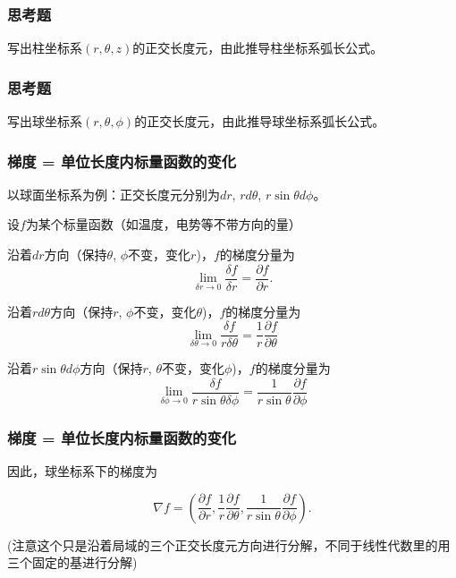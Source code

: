 \documentclass[CJK]{beamer}
\begin{document}
\begin{frame}
\frametitle{思考题}



写出柱坐标系$(r,\theta, z)$的正交长度元，由此推导柱坐标系弧长公式。


\end{frame}


\begin{frame}
\frametitle{思考题}



写出球坐标系$(r,\theta, \phi)$的正交长度元，由此推导球坐标系弧长公式。


\end{frame}


\begin{frame}
  \frametitle{梯度 = 单位长度内标量函数的变化}
  
  以球面坐标系为例：正交长度元分别为$dr$, $rd\theta$, $r\sin\theta d\phi$。

  \skipline

  设$f$为某个标量函数（如温度，电势等不带方向的量）

  \bitem

\item{沿着$dr$方向（保持$\theta$, $\phi$不变，变化$r$)，$f$的梯度分量为
    $$\lim_{\delta r\rightarrow 0}\frac{\delta f}{\delta r} = \frac{\partial f}{\partial r}.$$}

\item{沿着$rd\theta$方向（保持$r$, $\phi$不变，变化$\theta$)，$f$的梯度分量为
  $$\lim_{\delta \theta \rightarrow 0}\frac{\delta f}{r\delta \theta} = \frac{1}{r}\frac{\partial f}{\partial \theta}$$}

\item{沿着$r\sin\theta d\phi$方向（保持$r$, $\theta$不变，变化$\phi$)，$f$的梯度分量为
  $$\lim_{\delta \phi \rightarrow 0}\frac{\delta f}{r\sin\theta \delta \phi} = \frac{1}{r\sin\theta}\frac{\partial f}{\partial \phi}$$}
  
    \eitem

  
\end{frame}



\begin{frame}
  \frametitle{梯度 = 单位长度内标量函数的变化}
  

  因此，球坐标系下的梯度为

  $$\nabla f = \left(\frac{\partial f}{\partial r}, \frac{1}{r}\frac{\partial f}{\partial \theta}, \frac{1}{r\sin\theta}\frac{\partial f}{\partial \phi} \right).$$

  \skiplines
  
  (注意这个只是沿着局域的三个正交长度元方向进行分解，不同于线性代数里的用三个固定的基进行分解)
  
\end{frame}
\end{document}

